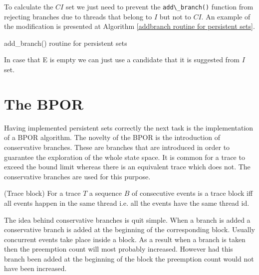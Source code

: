 To calculate the $CI$ set we just need to prevent the \verb|add\_branch()| function from rejecting branches due to threads that belong to $I$ but not to $CI$.
An example of the modification is presented at Algorithm \ref{addbranch routine for persistent sets}.

\begin{algorithm}
    \caption{add\_branch() routine for persistent sets}
    \label{addbranch routine for persistent sets}
\end{algorithm}

In case that E is empty we can just use a candidate that it is suggested from $I$ set.

\section{The BPOR}
Having implemented persistent sets correctly the next task is the implementation of a BPOR algorithm. The novelty of the BPOR is the introduction of conservative branches. These
are branches that are introduced in order to guarantee the exploration of the whole state space. It is common for a trace to exceed the bound limit whereas there is
an equivalent trace which does not. The conservative branches are used for this purpose.

\begin{definition}{(Trace block)}
For a trace $T$ a sequence $B$ of consecutive events is a trace block iff all events happen in the same thread i.e. all the events have the same thread id.
\end{definition}

The idea behind conservative branches is quit simple. When a branch is added a conservative branch is added at the beginning of the corresponding block.
Usually concurrent events take place inside a block. As a result when a branch is taken then the preemption count will most probably increased. However had this
branch been added at the beginning of the block the preemption count would not have been increased. 

